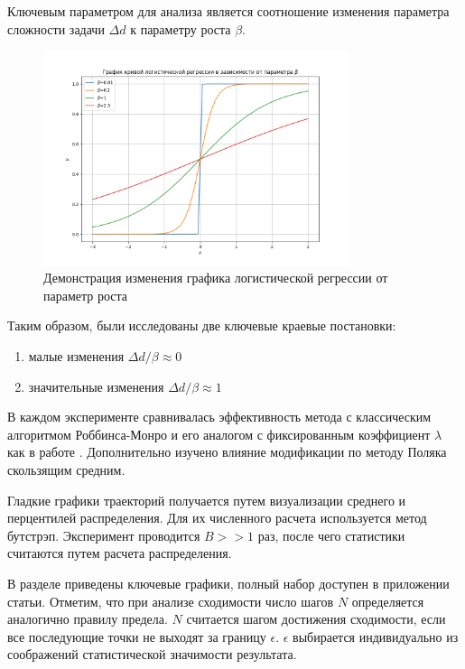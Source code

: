 \documentclass{mipt-thesis-bs}
\begin{document}
Ключевым параметром для анализа является соотношение изменения параметра сложности задачи $\Delta d$ к параметру роста ${\beta}$.
\begin{figure}[h]
    \centering
    \includegraphics[width=0.8\textwidth]{assets/logistic.png}
    \caption{Демонстрация изменения графика логистической регрессии от параметр роста}
    \label{logistic_figure}
\end{figure}
Таким образом, были исследованы две ключевые краевые постановки: \begin{enumerate}
    \item малые изменения  $\Delta d / \beta \approx 0$ 
    \item значительные изменения $\Delta d / \beta \approx 1$ 
\end{enumerate}
В каждом эксперименте сравнивалась эффективность метода с классическим алгоритмом Роббинса-Монро и его аналогом с фиксированным коэффициент $\lambda$ как в работе \cite{yazidi2020balanced}. Дополнительно изучено влияние модификации по методу Поляка скользящим средним. 

Гладкие графики траекторий получается путем визуализации среднего и перцентилей распределения. Для их численного расчета используется метод бутстрэп.
Эксперимент проводится $B >> 1$ раз, после чего статистики считаются путем расчета распределения.   

В разделе приведены ключевые графики, полный набор доступен в приложении статьи. Отметим, что при анализе сходимости число шагов $N$ определяется аналогично правилу предела.
$N$ считается шагом достижения сходимости,
если все последующие точки не выходят за границу $\epsilon$.  $\epsilon$ выбирается индивидуально из соображений статистической значимости результата. 
\end{document}
